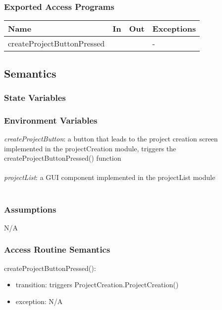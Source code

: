\documentclass[12pt, titlepage]{article}
\begin{document}
	\subsubsection{Exported Access Programs}
	
	\begin{center}
		\begin{tabular}{p{2cm} p{4cm} p{4cm} p{2cm}}
			\hline
			\textbf{Name} & \textbf{In} & \textbf{Out} & \textbf{Exceptions} \\
			\hline
			createProjectButtonPressed &  &  & - \\
			\hline
		\end{tabular}
	\end{center}
	
	\subsection{Semantics}
	
	\subsubsection{State Variables}
	
	
	\subsubsection{Environment Variables}
	
	\textit{createProjectButton}: a button that leads to the project creation screen implemented in the projectCreation module, triggers the createProjectButtonPressed() function \\\\ 
	\textit{projectList}: a GUI component implemented in the projectList module \\\\
	
	\subsubsection{Assumptions}
	N/A
	
	\subsubsection{Access Routine Semantics}
	
	\noindent createProjectButtonPressed():
	\begin{itemize}
		\item transition: triggers ProjectCreation.ProjectCreation()
		\item exception: N/A
	\end{itemize}
	
\end{document}
